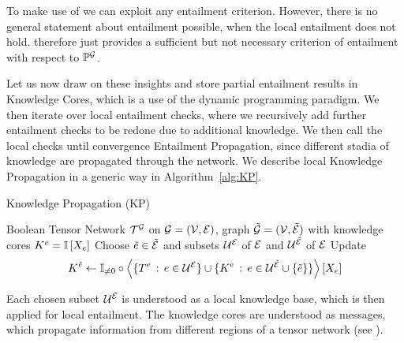 \begin{remark}
	To make use of  we can exploit any entailment criterion.
	However, there is no general statement about entailment possible, when the local entailment does not hold.
	 therefore just provides a sufficient but not necessary criterion of entailment with respect to $\mathbb{P}^{\mathcal{G}}$.
\end{remark}




Let us now draw on these insights and store partial entailment results in Knowledge Cores, which is a use of the dynamic programming paradigm.
We then iterate over local entailment checks, where we recursively add further entailment checks to be redone due to additional knowledge.
We then call the local checks until convergence Entailment Propagation, since different stadia of knowledge are propagated through the network.
We describe local Knowledge Propagation in a generic way in Algorithm~\ref{alg:KP}.

\begin{algorithm}[hbt!]
\caption{Knowledge Propagation (KP)}\label{alg:knowledgePropagation}
\begin{algorithmic}
\State Boolean Tensor Network $\mathcal{T}^{\mathcal{G}}$ on $\mathcal{G}=(\mathcal{V},\mathcal{E})$, graph $\tilde{\mathcal{G}}=(\mathcal{V},\tilde{\mathcal{E}})$ with knowledge cores $K^{e}=\mathbb{I}\left[X_{e}\right]$
	\State Choose $\tilde{e}\in\tilde{\mathcal{E}}$ and subsets $\mathcal{U}^{\mathcal{E}}$ of $\mathcal{E}$ and $\mathcal{U}^{\tilde{\mathcal{E}}}$ of $\mathcal{E}$  %
	\State Update
	\begin{align*}
		K^{\tilde{e}} \leftarrow\mathbb{I}_{\neq0}\circ\left\langle 
			\{T^{e} \, : \, e\in\mathcal{U}^{\mathcal{E}}\} \cup \{K^{e} \, : \, e\in\mathcal{U}^{\tilde{\mathcal{E}}}\cup\{\tilde{e}\}\}
		\right\rangle \left[ X_{e} \right]
	\end{align*}
\EndWhile
\end{algorithmic}
\end{algorithm}

Each chosen subset $\mathcal{U}^{\mathcal{E}}$ is understood as a local knowledge base, which is then applied for local entailment.
The knowledge cores are understood as messages, which propagate information from different regions of a tensor network (see ).


